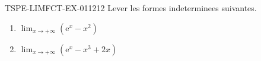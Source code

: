 \begin{exercice}{TSPE-LIMFCT-EX-011}{2}{12}
Lever les formes indeterminees suivantes.
\begin{enumerate}
  \item $\lim_{x \to +\infty} (\mathrm{e}^x - x^2)$
  \item $\lim_{x \to +\infty} (\mathrm{e}^x - x^3 + 2x)$
\end{enumerate}
\end{exercice}
